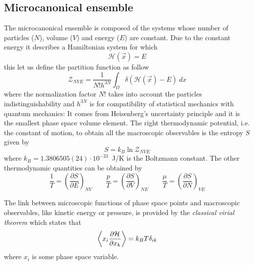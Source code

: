 \subsection{Microcanonical ensemble}
The microcanonical ensemble is composed of the systems whose number of particles ($N$), volume ($V$) and energy ($E$) are constant. Due to the constant energy it describes a Hamiltonian system for which
\begin{equation*}
	\mathcal{H}(\vec x) = E
\end{equation*}
this let us define the partition function as follow
\begin{equation}
	\mathcal{Z}_{NVE} = \frac{1}{N!h^{3N}}\int_\Omega \delta(\mathcal{H}(\vec x) - E)\ dx
	\label{eq:micropartition}
\end{equation}
where the normalization factor $N!$ takes into account the particles indistinguishability and $h^{3N}$ is for compatibility of statistical mechanics with quantum mechanics: It comes from Heisenberg’s uncertainty principle and it is the smallest phase space volume element. The right thermodynamic potential, i.e. the constant of motion, to obtain all the macroscopic observables is the entropy $S$ given by
\begin{equation*}
	S = k_B \ln \mathcal{Z}_{NVE}
\end{equation*}
where $k_B = 1.3806505(24) \cdot 10^{-23}$~J/K is the Boltzmann constant. The other thermodynamic quantities can be obtained by
\begin{equation*}
	\frac{1}{T} = \left ( \frac{\partial S}{\partial E}\right )_{NV} \qquad \frac{p}{T} = \left ( \frac{\partial S}{\partial V}\right )_{NE} \qquad \frac{\mu}{T} = \left ( \frac{\partial S}{\partial N}\right )_{VE}
\end{equation*}

The link between microscopic functions of phase space points and macroscopic observables, like kinetic energy or pressure, is provided by the \textit{classical virial theorem} which states that
\begin{equation}
	\left \langle x_i\frac{\partial\mathcal{H}}{\partial x_k} \right \rangle = k_B T \delta_{ik}
	\label{eq:virial}
\end{equation}
where $x_i$ is some phase space variable.

